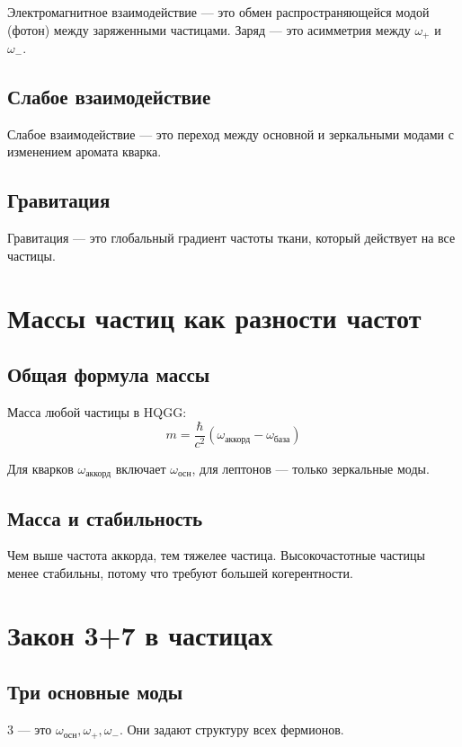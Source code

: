 \documentclass[12pt,a4paper]{article}
\begin{document}
Электромагнитное взаимодействие — это обмен распространяющейся модой (фотон) между заряженными частицами. Заряд — это асимметрия между \(\omega_{+}\) и \(\omega_{-}\).

\subsection{Слабое взаимодействие}

Слабое взаимодействие — это переход между основной и зеркальными модами с изменением аромата кварка.

\subsection{Гравитация}

Гравитация — это глобальный градиент частоты ткани, который действует на все частицы.

\section{Массы частиц как разности частот}

\subsection{Общая формула массы}

Масса любой частицы в HQGG:
\[
m = \frac{\hbar}{c^2} \left( \omega_{\text{аккорд}} - \omega_{\text{база}} \right)
\]

Для кварков \(\omega_{\text{аккорд}}\) включает \(\omega_{\text{осн}}\), для лептонов — только зеркальные моды.

\subsection{Масса и стабильность}

Чем выше частота аккорда, тем тяжелее частица. Высокочастотные частицы менее стабильны, потому что требуют большей когерентности.

\section{Закон 3+7 в частицах}

\subsection{Три основные моды}

3 — это \(\omega_{\text{осн}}, \omega_{+}, \omega_{-}\). Они задают структуру всех фермионов.
\end{document}
